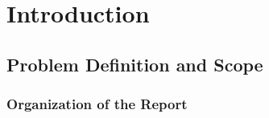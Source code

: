 \chapter{Introduction}
\label{ch:intro}

\section{Problem Definition and Scope}
\label{sec:scope}


\subsection{Organization of the Report}